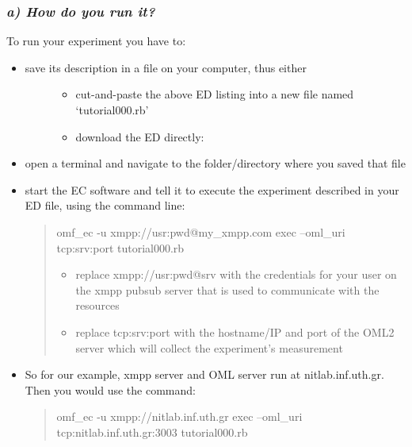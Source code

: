 \documentclass[letterpaper,10pt,english]{sphinxmanual}
\begin{document}
\subsubsection{\emph{a) How do you run it?}}
\label{omf_example:a-how-do-you-run-it}
To run your experiment you have to:
\begin{itemize}
\item {} \begin{description}
\item[{save its description in a file on your computer, thus either}] \leavevmode\begin{itemize}
\item {} 
cut-and-paste the above ED listing into a new file named `tutorial000.rb'

\item {} 
download the ED directly: 

\end{itemize}

\end{description}

\item {} 
open a terminal and navigate to the folder/directory where you saved that file

\item {} 
start the EC software and tell it to execute the experiment described in your ED file, using the command line:
\begin{quote}

omf\_ec -u xmpp://usr:pwd@my\_xmpp.com exec --oml\_uri tcp:srv:port tutorial000.rb
\begin{itemize}
\item {} 
replace xmpp://usr:pwd@srv with the credentials for your user on the xmpp pubsub server that is used to communicate with the resources

\item {} 
replace tcp:srv:port with the hostname/IP and port of the OML2 server which will collect the experiment's measurement

\end{itemize}
\end{quote}

\item {} 
So for our example, xmpp server and OML server run at nitlab.inf.uth.gr. Then you would use the command:
\begin{quote}

omf\_ec -u xmpp://nitlab.inf.uth.gr exec --oml\_uri tcp:nitlab.inf.uth.gr:3003 tutorial000.rb
\end{quote}

\end{itemize}
\end{document}
